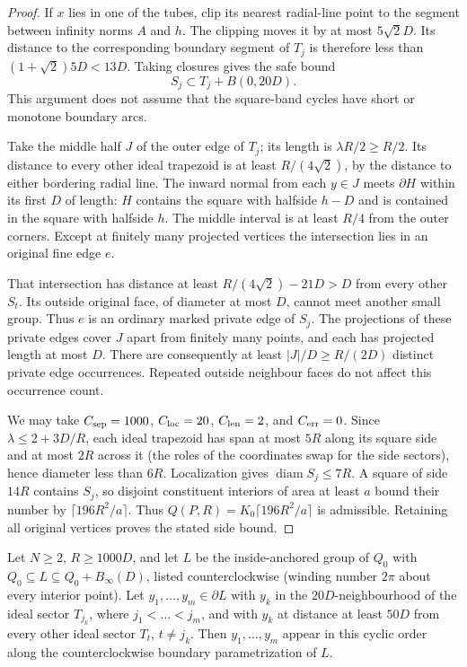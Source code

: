 \begin{proof}
If $x$ lies in one of the tubes, clip its nearest radial-line point to
the segment between infinity norms $A$ and $h$.  The clipping moves it
by at most $5\sqrt2D$.  Its distance to the corresponding boundary
segment of $T_j$ is therefore less than
$(1+\sqrt2)5D<13D$.  Taking closures gives the safe bound
\[
 S_j\subset T_j+B(0,20D).
\]
This argument does not assume that the square-band cycles have short or
monotone boundary arcs.

Take the middle half $J$ of the outer edge of $T_j$; its length is
$\lambda R/2\ge R/2$.  Its distance to every other ideal trapezoid is
at least $R/(4\sqrt2)$, by the distance to either bordering radial line.
The inward normal from each $y\in J$ meets $\partial H$ within its
first $D$ of length: $H$ contains the square with halfside $h-D$ and
is contained in the square with halfside $h$.  The middle interval is
at least $R/4$ from the outer corners.  Except at finitely many projected
vertices the intersection lies in an original fine edge $e$.

That intersection has distance at least
$R/(4\sqrt2)-21D>D$ from every other $S_t$.  Its outside original
face, of diameter at most $D$, cannot meet another small group.  Thus
$e$ is an ordinary marked private edge of $S_j$.  The projections of
these private edges cover $J$ apart from finitely many points, and each
has projected length at most $D$.  There are consequently at least
$|J|/D\ge R/(2D)$ distinct private edge occurrences.  Repeated outside
neighbour faces do not affect this occurrence count.

We may take $C_{\rm sep}=1000$, $C_{\rm loc}=20$,
$C_{\rm len}=2$, and $C_{\rm err}=0$.  Since
$\lambda\le2+3D/R$, each ideal trapezoid has span at most $5R$ along
its square side and at most $2R$ across it (the roles of the coordinates
swap for the side sectors), hence diameter less than $6R$.
Localization gives $\operatorname{diam}S_j\le7R$.  A square of side
$14R$ contains $S_j$, so disjoint constituent interiors of area at
least $a$ bound their number by $\lceil196R^2/a\rceil$.
Thus $Q(P,R)=K_0\lceil196R^2/a\rceil$ is admissible.  Retaining all
original vertices proves the stated side bound.
\end{proof}

\begin{lemma}
\label{lem:inner-sector-order}
Let $N\ge2$, $R\ge1000D$, and let $L$ be the inside-anchored group of $Q_0$
with $Q_0\subseteq L\subseteq Q_0+B_\infty(D)$, listed counterclockwise
(winding number $2\pi$ about every interior point).  Let
$y_1,\dots,y_m\in\partial L$ with $y_k$ in the $20D$-neighbourhood of the
ideal sector $T_{j_k}$, where $j_1<\dots<j_m$, and with $y_k$ at distance at
least $50D$ from every other ideal sector $T_t$, $t\ne j_k$.  Then
$y_1,\dots,y_m$ appear in this cyclic order along the counterclockwise
boundary parametrization of $L$.
\end{lemma}

